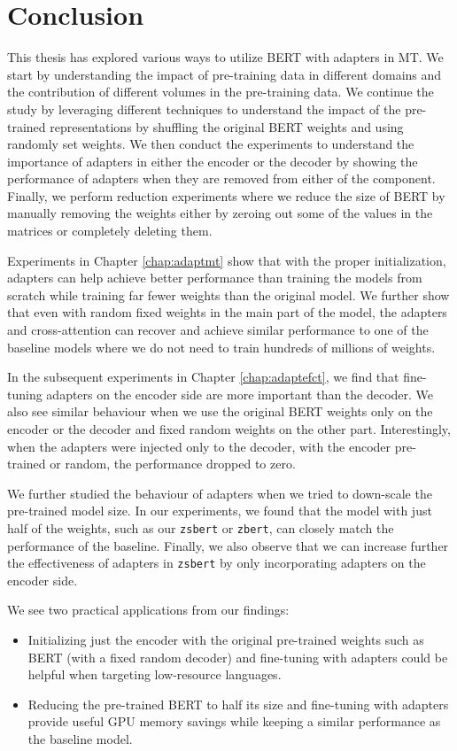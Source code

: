 \chapter*{Conclusion}
This thesis has explored various ways to utilize BERT with adapters in MT. We start by understanding the impact of pre-training data in different domains and the contribution of different volumes in the pre-training data. We continue the study by leveraging different techniques to understand the impact of the pre-trained representations by shuffling the original BERT weights and using randomly set weights. We then conduct the experiments to understand the importance of adapters in either the encoder or the decoder by showing the performance of adapters when they are removed from either of the component. Finally, we perform reduction experiments where we reduce the size of BERT by manually removing the weights either by zeroing out some of the values in the matrices or completely deleting them.

Experiments in Chapter \ref{chap:adaptmt} show that with the proper initialization, adapters can help achieve better performance than training the models from scratch while training far fewer weights than the original model. We further show that even with random fixed weights in the main part of the model, the adapters and cross-attention can recover and achieve similar performance to one of the baseline models where we do not need to train hundreds of millions of weights.

In the subsequent experiments in Chapter \ref{chap:adaptefct}, we find that fine-tuning adapters on the encoder side are more important than the decoder. We also see similar behaviour when we use the original BERT weights only on the encoder or the decoder and fixed random weights on the other part. Interestingly, when the adapters were injected only to the decoder, with the encoder pre-trained or random, the performance dropped to zero.

We further studied the behaviour of adapters when we tried to down-scale the pre-trained model size. In our experiments, we found that the model with just half of the weights, such as our \texttt{zsbert} or \texttt{zbert}, can closely match the performance of the baseline. Finally, we also observe that we can increase further the effectiveness of adapters in \texttt{zsbert} by only incorporating adapters on the encoder side.

We see two practical applications from our findings:
\begin{itemize}
    \item Initializing just the encoder with the original pre-trained weights such as BERT (with a fixed random decoder) and fine-tuning with adapters could be helpful when targeting low-resource languages.
    \item Reducing the pre-trained BERT to half its size and fine-tuning with adapt\-ers provide useful GPU memory savings while keeping a similar performance as the baseline model.
\end{itemize}


